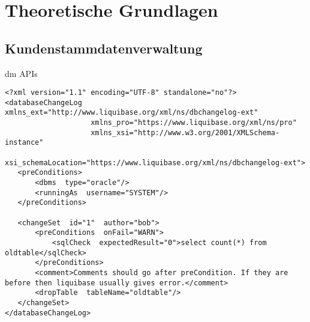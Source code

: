 \chapter{Theoretische Grundlagen}\label{ch:theoreticalFoundations}
    \section{Kundenstammdatenverwaltung}\label{sec:customerDataManagement}
        \lipsum[1]  \autocite[vgl. S.4-8]{Database.Springer.0}
        \ac{dm}
        \glspl{API}

\begin{lstlisting}[style=xmlStyle, caption={Beispiel eines Liquibase Changesets \autocite{liquibaseExample}}, label={lst:liquibaseChangesetExample}, firstnumber=1]
<?xml version="1.1" encoding="UTF-8" standalone="no"?>
<databaseChangeLog  xmlns_ext="http://www.liquibase.org/xml/ns/dbchangelog-ext"
                    xmlns_pro="https://www.liquibase.org/xml/ns/pro"
                    xmlns_xsi="http://www.w3.org/2001/XMLSchema-instance"
                    xsi_schemaLocation="https://www.liquibase.org/xml/ns/dbchangelog-ext">
   <preConditions> 
       <dbms  type="oracle"/> 
       <runningAs  username="SYSTEM"/> 
   </preConditions> 
 
   <changeSet  id="1"  author="bob"> 
       <preConditions  onFail="WARN"> 
           <sqlCheck  expectedResult="0">select count(*) from oldtable</sqlCheck> 
       </preConditions> 
       <comment>Comments should go after preCondition. If they are before then liquibase usually gives error.</comment> 
       <dropTable  tableName="oldtable"/> 
   </changeSet> 
</databaseChangeLog>
\end{lstlisting}